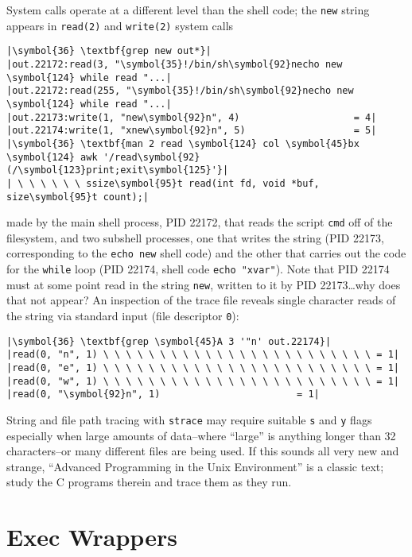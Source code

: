 \documentclass[10pt,a4paper]{article}
\begin{document}
System calls operate at a different level than the shell code; the
\texttt{new} string appears in \texttt{read(2)} and \texttt{write(2)}
system calls

\begin{lstlisting}
|\symbol{36} \textbf{grep new out*}|
|out.22172:read(3, "\symbol{35}!/bin/sh\symbol{92}necho new \symbol{124} while read "...|
|out.22172:read(255, "\symbol{35}!/bin/sh\symbol{92}necho new \symbol{124} while read "...|
|out.22173:write(1, "new\symbol{92}n", 4)                    = 4|
|out.22174:write(1, "xnew\symbol{92}n", 5)                   = 5|
|\symbol{36} \textbf{man 2 read \symbol{124} col \symbol{45}bx \symbol{124} awk '/read\symbol{92}(/\symbol{123}print;exit\symbol{125}'}|
| \ \ \ \ \ \ ssize\symbol{95}t read(int fd, void *buf, size\symbol{95}t count);|
\end{lstlisting}

made by the main shell process, PID 22172, that reads the script
\texttt{cmd} off of the filesystem, and two subshell processes, one that
writes the string (PID 22173, corresponding to the \texttt{echo new}
shell code) and the other that carries out the code for the
\texttt{while} loop (PID 22174, shell code \texttt{echo
"xvar"}). Note that PID 22174 must at some point read in the
string \texttt{new}, written to it by PID 22173\ldots why does that not
appear? An inspection of the trace file reveals single character reads
of the string via standard input (file descriptor \texttt{0}):

\begin{lstlisting}
|\symbol{36} \textbf{grep \symbol{45}A 3 '"n' out.22174}|
|read(0, "n", 1) \ \ \ \ \ \ \ \ \ \ \ \ \ \ \ \ \ \ \ \ \ \ \ \ = 1|
|read(0, "e", 1) \ \ \ \ \ \ \ \ \ \ \ \ \ \ \ \ \ \ \ \ \ \ \ \ = 1|
|read(0, "w", 1) \ \ \ \ \ \ \ \ \ \ \ \ \ \ \ \ \ \ \ \ \ \ \ \ = 1|
|read(0, "\symbol{92}n", 1)                        = 1|
\end{lstlisting}

String and file path tracing with \texttt{strace} may require suitable
\texttt{s} and \texttt{y} flags especially when
large amounts of data--where ``large'' is anything longer than 32
characters--or many different files are being used. If this sounds all
very new and strange, ``Advanced Programming in the Unix
Environment''\cite{stevens2013} is a classic text; study the C programs
therein and trace them as they run.

\section*{Exec Wrappers}
\end{document}
